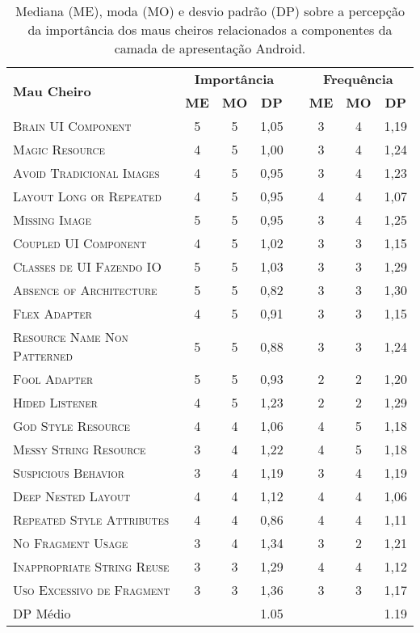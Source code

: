 \begin{table}[!htb]
\centering
\renewcommand*{\arraystretch}{1}
\footnotesize
\caption{Mediana (ME), moda (MO) e desvio padrão (DP) sobre a percepção da importância dos maus cheiros relacionados a componentes da camada de apresentação Android.}
\begin{tabular}{@{}p{5cm}cccp{.5cm}ccc@{}}
\toprule
\multirow{2}{*}{\textbf{Mau Cheiro}} & \multicolumn{3}{c}{\textbf{Importância}} & & \multicolumn{3}{c}{\textbf{Frequência}} \\ \cmidrule{2-4} \cmidrule{6-8}
                                      & \textbf{ME} & \textbf{MO} & \textbf{DP} & & \textbf{ME} & \textbf{MO} & \textbf{DP} \\
\bottomrule
\textsc{Brain UI Component} & 5 & 5 & 1,05 & & 3 & 4 & 1,19 \\
\textsc{Magic Resource} & 4 & 5 & 1,00 & & 3 & 4 & 1,24 \\
\textsc{Avoid Tradicional Images} & 4 & 5 & 0,95 & & 3 & 4 & 1,23 \\
\textsc{Layout Long or Repeated} & 4 & 5 & 0,95 & & 4 & 4 & 1,07 \\
\textsc{Missing Image} & 5 & 5 & 0,95 & & 3 & 4 & 1,25 \\
\textsc{Coupled UI Component} & 4 & 5 & 1,02 & & 3 & 3 & 1,15 \\
\textsc{Classes de UI Fazendo IO} & 5 & 5 & 1,03 & & 3 & 3 & 1,29 \\
\textsc{Absence of Architecture} & 5 & 5 & 0,82 & & 3 & 3 & 1,30 \\
\textsc{Flex Adapter} & 4 & 5 & 0,91 & & 3 & 3 & 1,15 \\
\textsc{Resource Name Non Patterned} & 5 & 5 & 0,88 & & 3 & 3 & 1,24 \\
\textsc{Fool Adapter} & 5 & 5 & 0,93 & & 2 & 2 & 1,20 \\
\textsc{Hided Listener} & 4 & 5 & 1,23 & & 2 & 2 & 1,29 \\
\textsc{God Style Resource} & 4 & 4 & 1,06 & & 4 & 5 & 1,18 \\
\textsc{Messy String Resource} & 3 & 4 & 1,22 & & 4 & 5 & 1,18 \\
\textsc{Suspicious Behavior} & 3 & 4 & 1,19 & & 3 & 4 & 1,19 \\
\textsc{Deep Nested Layout} & 4 & 4 & 1,12 & & 4 & 4 & 1,06 \\
\textsc{Repeated Style Attributes} & 4 & 4 & 0,86 & & 4 & 4 & 1,11 \\
\textsc{No Fragment Usage} & 3 & 4 & 1,34 & & 3 & 2 & 1,21 \\
\textsc{Inappropriate String Reuse} & 3 & 3 & 1,29 & & 4 & 4 & 1,12 \\
\textsc{Uso Excessivo de Fragment} & 3 & 3 & 1,36 & & 3 & 3 & 1,17 \\
\toprule
DP Médio &  &  & 1.05 &  & &  & 1.19 \\
\bottomrule
\end{tabular}
\label{tab:SmellFrequencyImportance}
\end{table}


